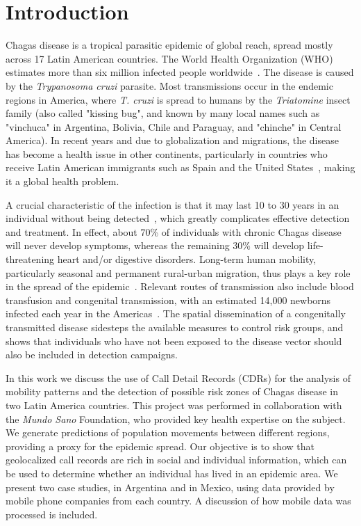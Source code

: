 \section{Introduction}

Chagas disease is a tropical parasitic epidemic of global reach, spread mostly across 17 Latin American countries. The World Health Organization (WHO) estimates more than six million infected people worldwide~\cite{who2016}. The disease is caused by the \textit{Trypanosoma cruzi} parasite. Most transmissions occur in the endemic regions in America, where \textit{T. cruzi} is spread to humans by the \textit{Triatomine} insect family (also called "kissing bug", and known by many local names such as "vinchuca" in Argentina, Bolivia, Chile and Paraguay, and "chinche" in Central America). In recent years and due to globalization and migrations, the disease has become a health issue in other continents, particularly in countries who receive Latin American immigrants such as Spain and the United States~\cite{schmunis2010chagas}, making it a global health problem.

A crucial characteristic of the infection is that it may last 10 to 30 years in an individual without being detected~\cite{rassi2012american}, which greatly complicates effective detection and treatment. In effect, about 70\% of individuals with chronic Chagas disease will never develop symptoms, whereas the remaining 30\% will develop life-threatening heart and/or digestive disorders.
Long-term human mobility, particularly seasonal and permanent rural-urban migration, thus plays a key role in the spread of the epidemic~\cite{briceno2009chagas}. Relevant routes of transmission also include blood transfusion and congenital transmission, with an estimated 14,000 newborns infected each year in the Americas~\cite{OPS2006chagas}.
The spatial dissemination of a congenitally transmitted disease sidesteps the available measures to control risk groups, and shows that individuals who have not been exposed to the disease vector should also be included in detection campaigns.

In this work we discuss the use of Call Detail Records (CDRs) for the analysis of mobility patterns and the detection of possible risk zones of Chagas disease in two Latin America countries. This project was performed in collaboration with the \textit{Mundo Sano} Foundation, who provided key health expertise on the subject. We generate predictions of population movements between different regions, providing a proxy for the epidemic spread. Our objective is to show that geolocalized call records are rich in social and individual information, which can be used to determine whether an individual has lived in an epidemic area. We present two case studies, in Argentina and in Mexico, using data provided by mobile phone companies from each country. A discussion of how mobile data was processed is included. 

